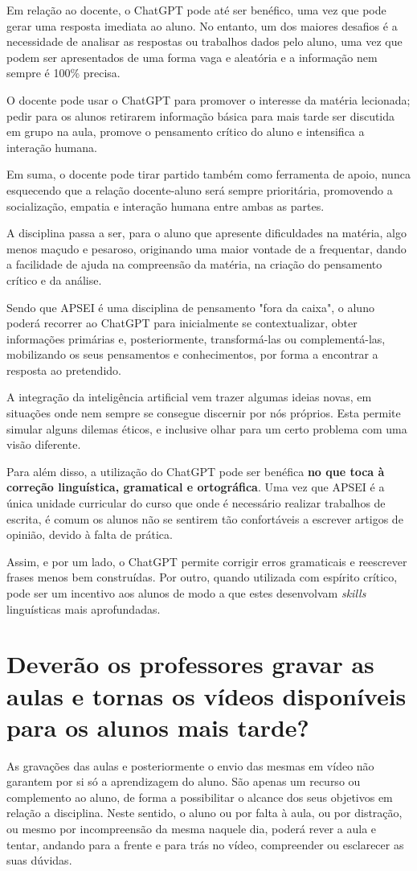 \documentclass[portuguese, 11pt, a4paper, titlepage, oneside]{article}
\begin{document}
Em relação ao docente, o ChatGPT pode até ser benéfico, uma vez que pode gerar uma resposta imediata ao aluno. No entanto, um dos maiores desafios é a necessidade de analisar as respostas ou trabalhos dados pelo aluno, uma vez que podem ser apresentados de uma forma vaga e aleatória e a informação nem sempre é 100\% precisa.

O docente pode usar o ChatGPT para promover o interesse da matéria lecionada; pedir para os alunos retirarem informação básica para mais tarde ser discutida em grupo na aula, promove o pensamento crítico do aluno e intensifica a interação humana.

Em suma, o docente pode tirar partido também como ferramenta de apoio, nunca esquecendo que a relação docente-aluno será sempre prioritária, promovendo a socialização, empatia e interação humana entre ambas as partes.

A disciplina passa a ser, para o aluno que apresente dificuldades na matéria, algo menos maçudo e pesaroso, originando uma maior vontade de a frequentar, dando a facilidade de ajuda na compreensão da matéria, na criação do pensamento crítico e da análise.

Sendo que APSEI é uma disciplina de pensamento "fora da caixa", o aluno poderá recorrer ao ChatGPT para inicialmente se contextualizar, obter informações primárias e, posteriormente, transformá-las ou complementá-las, mobilizando os seus pensamentos e conhecimentos, por forma a encontrar a resposta ao pretendido.

A integração da inteligência artificial vem trazer algumas ideias novas, em situações onde nem sempre se consegue discernir por nós próprios. Esta permite simular alguns dilemas éticos, e inclusive olhar para um certo problema com uma visão diferente.

Para além disso, a utilização do ChatGPT pode ser benéfica \textbf{no que toca à correção linguística, gramatical e ortográfica}. Uma vez que APSEI é a única unidade curricular do curso que onde é necessário realizar trabalhos de escrita, é comum os alunos não se sentirem tão confortáveis a escrever artigos de opinião, devido à falta de prática.

Assim, e por um lado, o ChatGPT permite corrigir erros gramaticais e reescrever frases menos bem construídas. Por outro, quando utilizada com espírito crítico, pode ser um incentivo aos alunos de modo a que estes desenvolvam \textit{skills} linguísticas mais aprofundadas.

\section{Deverão os professores gravar as aulas e tornas os vídeos disponíveis para os alunos mais tarde?}
As gravações das aulas e posteriormente o envio das mesmas em vídeo não garantem por si só a aprendizagem do aluno. São apenas um recurso ou complemento ao aluno, de forma a possibilitar o alcance dos seus objetivos em relação a disciplina. Neste sentido, o aluno ou por falta à aula, ou por distração, ou mesmo por incompreensão da mesma naquele dia, poderá rever a aula e tentar, andando para a frente e para trás no vídeo, compreender ou esclarecer as suas dúvidas.
\end{document}
